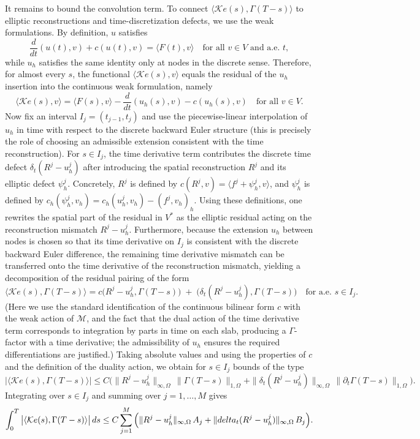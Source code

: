 \documentclass[11pt]{article}
\begin{document}
It remains to bound the convolution term. To connect \(\langle\mathcal K e(s),\Gamma(T-s)\rangle\) to elliptic reconstructions and time-discretization defects, we use the weak formulations. By definition, $u$ satisfies
\[
\frac{d}{dt}(u(t),v)+c(u(t),v)=\langle F(t),v\rangle
\quad\text{for all }v\in V\text{ and a.e. }t,
\]
while $u_h$ satisfies the same identity only at nodes in the discrete sense. Therefore, for almost every $s$, the functional \(\langle\mathcal K e(s),v\rangle\) equals the residual of the $u_h$ insertion into the continuous weak formulation, namely
\[
\langle\mathcal K e(s),v\rangle=\langle F(s),v\rangle-\frac{d}{dt}(u_h(s),v)-c(u_h(s),v)
\quad\text{for all }v\in V.
\]
Now fix an interval \(I_j=(t_{j-1},t_j)\) and use the piecewise-linear interpolation of $u_h$ in time with respect to the discrete backward Euler structure (this is precisely the role of choosing an admissible extension consistent with the time reconstruction). For \(s\in I_j\), the time derivative term contributes the discrete time defect \(\delta_t(R^j-u_h^j)\) after introducing the spatial reconstruction \(R^j\) and its elliptic defect \(\psi_h^j\). Concretely, \(R^j\) is defined by \(c(R^j,v)=\langle f^j+\psi_h^j,v\rangle\), and \(\psi_h^j\) is defined by \(c_h(\psi_h^j,v_h)=c_h(u_h^j,v_h)-(f^j,v_h)_h\). Using these definitions, one rewrites the spatial part of the residual in \(V^*\) as the elliptic residual acting on the reconstruction mismatch \(R^j-u_h^j\). Furthermore, because the extension $u_h$ between nodes is chosen so that its time derivative on \(I_j\) is consistent with the discrete backward Euler difference, the remaining time derivative mismatch can be transferred onto the time derivative of the reconstruction mismatch, yielding a decomposition of the residual pairing of the form
\[
\langle\mathcal K e(s),\Gamma(T-s)\rangle
= c\big(R^j-u_h^j,\Gamma(T-s)\big)\; +\; \big(\delta_t(R^j-u_h^j),\Gamma(T-s)\big)
\quad\text{for a.e. }s\in I_j.
\]
(Here we use the standard identification of the continuous bilinear form $c$ with the weak action of \(\mathcal M\), and the fact that the dual action of the time derivative term corresponds to integration by parts in time on each slab, producing a $\Gamma$-factor with a time derivative; the admissibility of $u_h$ ensures the required differentiations are justified.) Taking absolute values and using the properties of $c$ and the definition of the duality action, we obtain for \(s\in I_j\) bounds of the type
\[
\big|\langle\mathcal K e(s),\Gamma(T-s)\rangle\big|
\le C\Big(\|R^j-u_h^j\|_{\infty,\Omega}\,\|\Gamma(T-s)\|_{1,\Omega}
+\|\delta_t(R^j-u_h^j)\|_{\infty,\Omega}\,\|\partial_t\Gamma(T-s)\|_{1,\Omega}\Big).
\]
Integrating over \(s\in I_j\) and summing over \(j=1,\dots,M\) gives
\[
\int_0^T \big|\langle\mathcal K e(s),\Gamma(T-s)\rangle\big|\,ds
\le C\sum_{j=1}^M\Big(\|R^j-u_h^j\|_{\infty,\Omega}\,A_j+\|\\delta_t(R^j-u_h^j)\|_{\infty,\Omega}\,B_j\Big).
\]
\end{document}
